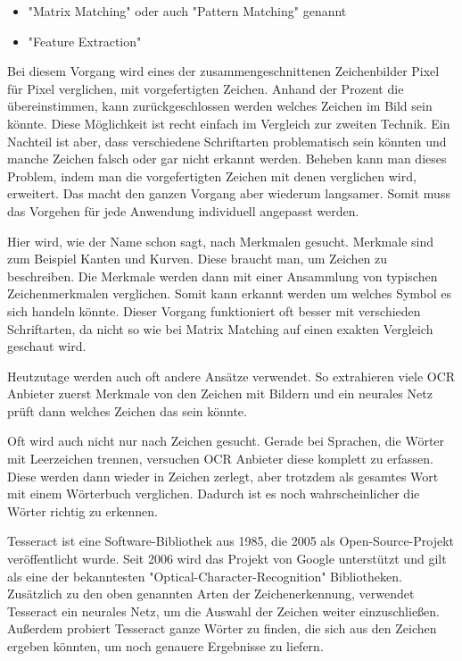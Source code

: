 \begin{itemize}
    \item "Matrix Matching" oder auch "Pattern Matching" genannt
    \item "Feature Extraction"
\end{itemize}


Bei diesem Vorgang wird eines der zusammengeschnittenen Zeichenbilder Pixel für Pixel verglichen, mit vorgefertigten Zeichen. Anhand der Prozent die übereinstimmen, kann zurückgeschlossen werden welches Zeichen im Bild sein könnte. Diese Möglichkeit ist recht einfach im Vergleich zur zweiten Technik. Ein Nachteil ist aber, dass verschiedene Schriftarten problematisch sein könnten und manche Zeichen falsch oder gar nicht erkannt werden. Beheben kann man dieses Problem, indem man die vorgefertigten Zeichen mit denen verglichen wird, erweitert. Das macht den ganzen Vorgang aber wiederum langsamer. Somit muss das Vorgehen für jede Anwendung individuell angepasst werden.\cite{OCRRecognition}


Hier wird, wie der Name schon sagt, nach Merkmalen gesucht. Merkmale sind zum Beispiel Kanten und Kurven. Diese braucht man, um Zeichen zu beschreiben. Die Merkmale werden dann mit einer Ansammlung von typischen Zeichenmerkmalen verglichen. Somit kann erkannt werden um welches Symbol es sich handeln könnte. Dieser Vorgang funktioniert oft besser mit verschieden Schriftarten, da nicht so wie bei Matrix Matching auf einen exakten Vergleich geschaut wird.\cite{OCRRecognition}


Heutzutage werden auch oft andere Ansätze verwendet. So extrahieren viele OCR Anbieter zuerst Merkmale von den Zeichen mit Bildern und ein neurales Netz prüft dann welches Zeichen das sein könnte.

Oft wird auch nicht nur nach Zeichen gesucht. Gerade bei Sprachen, die Wörter mit Leerzeichen trennen, versuchen OCR Anbieter diese komplett zu erfassen. Diese werden dann wieder in Zeichen zerlegt, aber trotzdem als gesamtes Wort mit einem Wörterbuch verglichen. Dadurch ist es noch wahrscheinlicher die Wörter richtig zu erkennen. 

\label{sec:tesseract}

Tesseract ist eine Software-Bibliothek aus 1985, die 2005 als Open-Source-Projekt veröffentlicht wurde. Seit 2006 wird das Projekt von Google unterstützt und gilt als eine der bekanntesten "Optical-Character-Recognition" Bibliotheken. Zusätzlich zu den oben genannten Arten der Zeichenerkennung, verwendet Tesseract ein neurales Netz, um die Auswahl der Zeichen weiter einzuschließen. Außerdem probiert Tesseract ganze Wörter zu finden, die sich aus den Zeichen ergeben könnten, um noch genauere Ergebnisse zu liefern.\cite{Tesseract}

